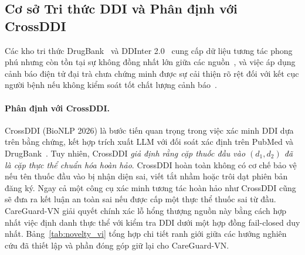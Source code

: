 \documentclass[11pt]{article}
\begin{document}
\subsection{Cơ sở Tri thức DDI và Phân định với CrossDDI}
Các kho tri thức DrugBank~\cite{wishart2018drugbank} và DDInter 2.0~\cite{tian2025ddinter,ddinterdownload2026} cung cấp dữ liệu tương tác phong phú nhưng còn tồn tại sự không đồng nhất lớn giữa các nguồn~\cite{gibson2026ddireview}, và việc áp dụng cảnh báo điện tử đại trà chưa chứng minh được sự cải thiện rõ rệt đối với kết cục người bệnh nếu không kiểm soát tốt chất lượng cảnh báo~\cite{holbrook2025alerts}.

\paragraph{Phân định với CrossDDI.}
CrossDDI (BioNLP 2026) là bước tiến quan trọng trong việc xác minh DDI dựa trên bằng chứng, kết hợp trích xuất LLM với đối soát xác định trên PubMed và DrugBank~\cite{crossddi2026}. Tuy nhiên, CrossDDI \emph{giả định rằng cặp thuốc đầu vào $(d_1, d_2)$ đã là cặp thực thể chuẩn hóa hoàn hảo}. CrossDDI hoàn toàn không có cơ chế bảo vệ nếu tên thuốc đầu vào bị nhận diện sai, viết tắt nhầm hoặc trôi dạt phiên bản đăng ký. Ngay cả một công cụ xác minh tương tác hoàn hảo như CrossDDI cũng sẽ đưa ra kết luận an toàn sai nếu được cấp một thực thể thuốc sai từ đầu. CareGuard-VN giải quyết chính xác lỗ hổng thượng nguồn này bằng cách hợp nhất việc định danh thực thể với kiểm tra DDI dưới một hợp đồng fail-closed duy nhất. Bảng~\ref{tab:novelty_vi} tổng hợp chi tiết ranh giới giữa các hướng nghiên cứu đã thiết lập và phần đóng góp giữ lại cho CareGuard-VN.
\end{document}
